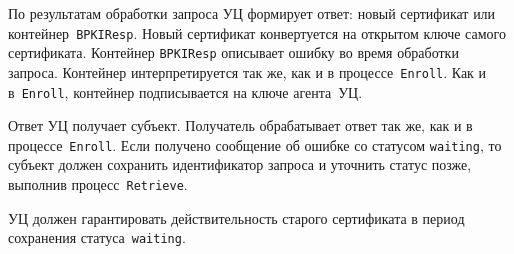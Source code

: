 По результатам обработки запроса УЦ формирует ответ: новый сертификат или 
контейнер~\texttt{BPKIResp}. Новый сертификат конвертуется на открытом 
ключе самого сертификата. Контейнер \texttt{BPKIResp} описывает ошибку во 
время обработки запроса. Контейнер интерпретируется так же, как и в 
процессе~\texttt{Enroll}. Как и в~\texttt{Enroll}, контейнер подписывается 
на ключе агента~УЦ.

Ответ УЦ получает субъект. Получатель обрабатывает ответ так же, 
как и в процессе~\texttt{Enroll}. 
%
Если получено сообщение об ошибке со статусом
\texttt{waiting}, то субъект должен сохранить идентификатор запроса
и уточнить статус позже, выполнив процесс~\texttt{Retrieve}.

УЦ должен гарантировать действительность старого сертификата
в период сохранения статуса~\texttt{waiting}.

